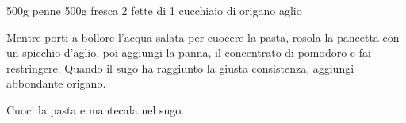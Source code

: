 \begin{ingreds}
	500g penne
	500g  fresca
	2 fette di 
	1 cucchiaio di 
	origano
	aglio



\end{ingreds}

\begin{method}
Mentre porti a bollore l'acqua salata per cuocere la pasta, rosola la pancetta con un spicchio d'aglio, poi aggiungi la panna, il concentrato di pomodoro e fai restringere. Quando il sugo ha raggiunto la giusta consistenza, aggiungi abbondante origano.

Cuoci la pasta e mantecala nel sugo.


\end{method}





